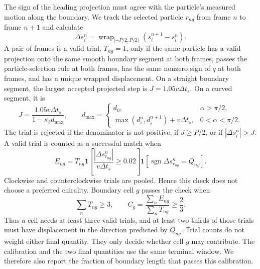 \documentclass[11pt]{article}
\numberwithin{equation}{section}
\begin{document}
The sign of the heading projection must agree with the particle's measured
motion along the boundary.  We track the selected particle $r_{ng}$ from frame
$n$ to frame $n+1$ and calculate
\begin{equation}
  \Delta s_{i}^{n}
  =\operatorname{wrap}_{[-P/2,P/2)}
  \left(s_i^{n+1}-s_i^n\right).
  \label{eq:wrapped_boundary_increment}
\end{equation}
A pair of frames is a valid trial, $T_{ng}=1$, only if the same particle has a
valid projection onto the same smooth boundary segment at both frames, passes
the particle-selection rule at both frames, has the same nonzero sign of $q$ at
both frames, and has a unique wrapped displacement.  On a straight boundary
segment, the largest accepted projected step is
$J=1.05v\Delta t_s$.  On a curved segment, it is
\begin{equation}
  J=
  \frac{1.05v\Delta t_s}{1-\kappa_b d_{\max}},
  \qquad
  d_{\max}=\begin{cases}
  d_0,&\alpha>\pi/2,\\
  \max(d_i^n,d_i^{n+1})+v\Delta t_s,&0<\alpha<\pi/2.
  \end{cases}
  \label{eq:projection_increment_bound}
\end{equation}
The trial is rejected if the denominator is not positive, if $J\ge P/2$, or if
$|\Delta s_i^n|>J$.  A valid trial is counted as a successful match when
\begin{equation}
  E_{ng}=T_{ng}
  \mathbf 1\left[
  \frac{|\Delta s_{r_{ng}}^n|}{v\Delta t_s}\ge0.02
  \right]
  \mathbf 1\left[
  \operatorname{sgn}\Delta s_{r_{ng}}^n=Q_{ng}
  \right].
  \label{eq:kinematic_calibration_success}
\end{equation}
Clockwise and counterclockwise trials are pooled.  Hence this check does not
choose a preferred chirality.  Boundary cell $g$ passes the check when
\begin{equation}
  \sum_nT_{ng}\ge3,
  \qquad
  C_g=\frac{\sum_nE_{ng}}{\sum_nT_{ng}}\ge\frac{2}{3}.
  \label{eq:kinematic_calibration_gate}
\end{equation}
Thus a cell needs at least three valid trials, and at least two thirds of those
trials must have displacement in the direction predicted by $Q_{ng}$.  Trial
counts do not weight either final quantity.  They only decide whether cell $g$
may contribute.  The calibration and the two final quantities use the same
terminal window.  We therefore also report the fraction of boundary length
that passes this calibration.
\end{document}
